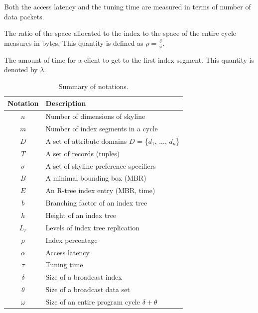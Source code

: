 Both the access latency and the tuning time are measured in terms
of number of data packets.

\begin{definition}\label{def:index_percentage}
The ratio of the space allocated to the index to the space of the
entire cycle measures in bytes. This quantity is defined as $\rho
= \frac{\delta}{\omega}$.
\end{definition}

\begin{definition}\label{def:index_probe}
The amount of time for a client to get to the first index segment.
This quantity is denoted by $\lambda$.
\end{definition}


\begin{table}[!h]
\centering \caption{Summary of notations.} \vspace*{5pt}
\label{tab:index_attr}
\begin{tabular}{|c|p{2.45in}|}
\hline
{\bf Notation} & {\bf Description}\\
\hline\hline
$n$ & Number of dimensions of skyline \\
$m$ & Number of index segments in a cycle \\
$D$ & A set of attribute domains $D$ = \{$d_1$, ..., $d_n$\} \\
$T$ & A set of records (tuples) \\
$\sigma$ & A set of skyline preference specifiers \\
$B$ & A minimal bounding box (MBR) \\
$E$ & An R-tree index entry (MBR, time) \\
$b$ & Branching factor of an index tree \\
$h$ & Height of an index tree \\
$L_r$ & Levels of index tree replication \\
$\rho$ & Index percentage \\
$\alpha$ & Access latency \\
$\tau$ & Tuning time \\
$\delta$ & Size of a broadcast index \\
$\theta$ & Size of a broadcast data set \\
$\omega$ & Size of an entire program cycle $\delta + \theta$ \\
\hline
\end{tabular}
\end{table}

